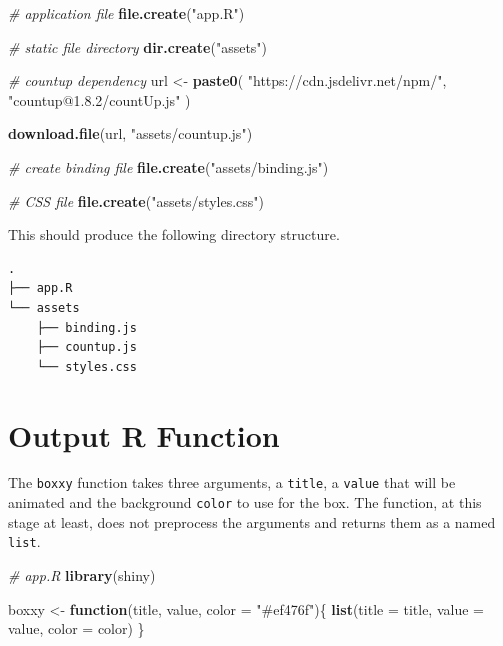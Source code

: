 \documentclass[10pt,]{krantz}
\makeatletter
\newenvironment{Shaded}{\begin{snugshade}}{\end{snugshade}}
\newcommand{\CommentTok}[1]{\textcolor[rgb]{0.37,0.37,0.37}{\textit{#1}}}
\newcommand{\ControlFlowTok}[1]{\textcolor[rgb]{0.27,0.27,0.27}{\textbf{#1}}}
\newcommand{\DataTypeTok}[1]{\textcolor[rgb]{0.27,0.27,0.27}{#1}}
\newcommand{\KeywordTok}[1]{\textcolor[rgb]{0.27,0.27,0.27}{\textbf{#1}}}
\newcommand{\NormalTok}[1]{#1}
\newcommand{\StringTok}[1]{\textcolor[rgb]{0.5,0.5,0.5}{#1}}
\newenvironment{kframe}{%
\medskip{}
\setlength{\fboxsep}{.8em}
 \def\at@end@of@kframe{}%
 \ifinner\ifhmode%
  \def\at@end@of@kframe{\end{minipage}}%
  \begin{minipage}{\columnwidth}%
 \fi\fi%
 \def\FrameCommand##1{\hskip\@totalleftmargin \hskip-\fboxsep
 \colorbox{shadecolor}{##1}\hskip-\fboxsep
     \hskip-\linewidth \hskip-\@totalleftmargin \hskip\columnwidth}%
 \MakeFramed {\advance\hsize-\width
   \@totalleftmargin\z@ \linewidth\hsize
   \@setminipage}}%
 {\par\unskip\endMakeFramed%
 \at@end@of@kframe}
\renewenvironment{Shaded}{\begin{kframe}}{\end{kframe}}
\makeatother
\begin{document}
\begin{Shaded}
\begin{Highlighting}[]
\CommentTok{# application file}
\KeywordTok{file.create}\NormalTok{(}\StringTok{"app.R"}\NormalTok{)}

\CommentTok{# static file directory}
\KeywordTok{dir.create}\NormalTok{(}\StringTok{"assets"}\NormalTok{)}

\CommentTok{# countup dependency}
\NormalTok{url <-}\StringTok{ }\KeywordTok{paste0}\NormalTok{(}
  \StringTok{"https://cdn.jsdelivr.net/npm/"}\NormalTok{,}
  \StringTok{"countup@1.8.2/countUp.js"}
\NormalTok{)}

\KeywordTok{download.file}\NormalTok{(url, }\StringTok{"assets/countup.js"}\NormalTok{)}

\CommentTok{# create binding file}
\KeywordTok{file.create}\NormalTok{(}\StringTok{"assets/binding.js"}\NormalTok{)}

\CommentTok{# CSS file}
\KeywordTok{file.create}\NormalTok{(}\StringTok{"assets/styles.css"}\NormalTok{)}
\end{Highlighting}
\end{Shaded}

This should produce the following directory structure.

\begin{verbatim}
.
├── app.R
└── assets
    ├── binding.js
    ├── countup.js
    └── styles.css
\end{verbatim}

\hypertarget{shiny-output-r-fun}{%
\section{Output R Function}\label{shiny-output-r-fun}}

The \texttt{boxxy} function takes three arguments, a \texttt{title}, a \texttt{value} that will be animated and the background \texttt{color} to use for the box. The function, at this stage at least, does not preprocess the arguments and returns them as a named \texttt{list}.

\begin{Shaded}
\begin{Highlighting}[]
\CommentTok{# app.R}
\KeywordTok{library}\NormalTok{(shiny)}

\NormalTok{boxxy <-}\StringTok{ }\ControlFlowTok{function}\NormalTok{(title, value, }\DataTypeTok{color =} \StringTok{"#ef476f"}\NormalTok{)\{}
  \KeywordTok{list}\NormalTok{(}\DataTypeTok{title =}\NormalTok{ title, }\DataTypeTok{value =}\NormalTok{ value, }\DataTypeTok{color =}\NormalTok{ color)}
\NormalTok{\}}
\end{Highlighting}
\end{Shaded}
\end{document}
